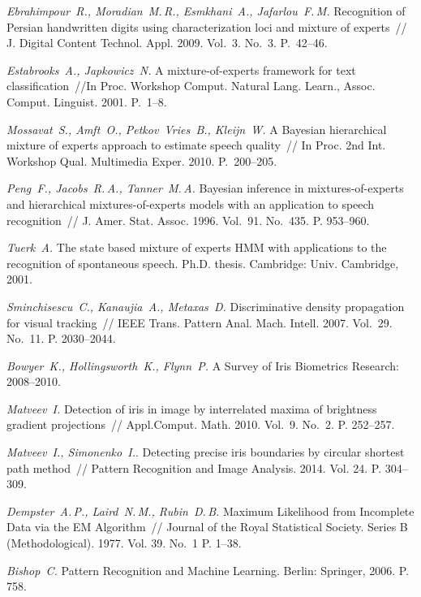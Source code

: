 \documentclass[12pt, twoside]{article}
\numberwithin{equation}{section}
\newcommand*{\No}{No.}
\begin{document}
\begin{thebibliography}{99}
	\textit{Ebrahimpour~R., Moradian~M.\,R., Esmkhani~A., Jafarlou~F.\,M.} Recognition of Persian handwritten digits using characterization loci and mixture of experts~// J. Digital Content Technol. Appl. 2009. Vol.~3. \No~3. P.~42--46.
	
	\textit{Estabrooks~A., Japkowicz~N.} A mixture-of-experts framework for text classification~//In Proc. Workshop Comput. Natural Lang. Learn., Assoc. Comput. Linguist. 2001. P.~1--8.
	
	\textit{Mossavat~S., Amft~O., Petkov~Vries~B., Kleijn~W.} A Bayesian hierarchical mixture of experts approach to estimate speech quality~// In Proc. 2nd Int. Workshop Qual. Multimedia Exper. 2010. P.~200--205. 

	\textit{Peng~F., Jacobs~R.\,A., Tanner~M.\,A.} Bayesian inference in mixtures-of-experts and hierarchical mixtures-of-experts models with an application to speech recognition~// J. Amer. Stat. Assoc. 1996. Vol.~91. \No~435. P. 953--960.
	
	\textit{Tuerk~A.} The state based mixture of experts HMM with applications to the recognition of spontaneous speech. Ph.D. thesis. Cambridge: Univ. Cambridge, 2001.
	
	\textit{Sminchisescu~C., Kanaujia~A., Metaxas~D.} Discriminative density propagation for visual tracking~// IEEE Trans. Pattern Anal. Mach. Intell. 2007. Vol.~29. \No~11. P. 2030--2044.

	\textit{Bowyer~K., Hollingsworth~K., Flynn~P.} A Survey of Iris Biometrics Research: 2008--2010.
	
	\textit{Matveev~I.} Detection of iris in image by interrelated maxima of brightness gradient projections~// Appl.Comput. Math. 2010. Vol.~9. \No~2. P. 252--257.

	\textit{Matveev~I., Simonenko~I.}. Detecting precise iris boundaries by circular shortest path method~// Pattern Recognition and Image Analysis. 2014. Vol. 24. P. 304--309.
	
	\textit{Dempster~A.\,P., Laird~N.\,M., Rubin~D.\,B.} Maximum Likelihood from Incomplete Data via the EM Algorithm~// Journal of the Royal Statistical Society. Series B (Methodological). 1977. Vol. 39. \No~1 P. 1--38.
	
	\textit{Bishop~C.} Pattern Recognition and Machine Learning. Berlin: Springer, 2006. P. 758.

 \end{thebibliography}
\end{document}
